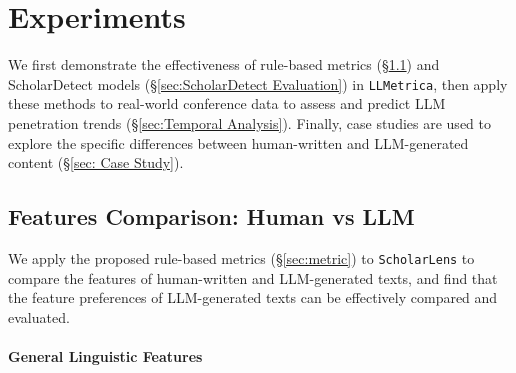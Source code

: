 
\section{Experiments}
\label{sec:Experiments}
We first demonstrate the effectiveness of rule-based metrics (\S\ref{sec: Features Comparison}) and ScholarDetect models (\S\ref{sec:ScholarDetect Evaluation}) in \texttt{LLMetrica}, then apply these methods to real-world conference data to assess and predict LLM penetration trends (\S\ref{sec:Temporal Analysis}). Finally, case studies are used to explore the specific differences between human-written and LLM-generated content (\S\ref{sec: Case Study}).







\subsection{Features Comparison: Human vs LLM}
\label{sec: Features Comparison}
We apply the proposed rule-based metrics (\S\ref{sec:metric}) to  \texttt{ScholarLens} to compare the features of human-written and LLM-generated texts, and find that the feature preferences of LLM-generated texts can be effectively compared and evaluated.




\paragraph{General Linguistic Features}

